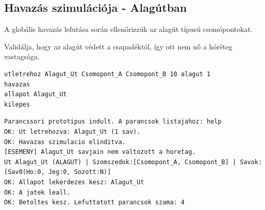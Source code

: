 \subsection{Havazás szimulációja - Alagútban}
\begin{test-case-description}
    A globális havazás lefutása során ellenőrizzük az alagút típusú csomópontokat.
\end{test-case-description}
\begin{test-case-function}
    Validálja, hogy az alagút védett a csapadéktól, így ott nem nő a hóréteg vastagsága.
\end{test-case-function}
\begin{test-case-input}
\begin{verbatim}
utletrehoz Alagut_Ut Csomopont_A Csomopont_B 10 alagut 1
havazas
allapot Alagut_Ut
kilepes
\end{verbatim}
\end{test-case-input}
\begin{test-case-output}
\begin{verbatim}
Parancssori prototipus indult. A parancsok listajahoz: help
OK: Ut letrehozva: Alagut_Ut (1 sav).
OK: Havazas szimulacio elinditva.
[ESEMENY] Alagut_Ut savjain nem valtozott a horetag.
Ut Alagut_Ut (ALAGUT) | Szomszedok:[Csomopont_A, Csomopont_B] | Savok: [Sav0(Ho:0, Jeg:0, Sozott:N)]
OK: Allapot lekerdezes kesz: Alagut_Ut
OK: A jatek leall.
OK: Betoltes kesz. Lefuttatott parancsok szama: 4
\end{verbatim}
\end{test-case-output}

